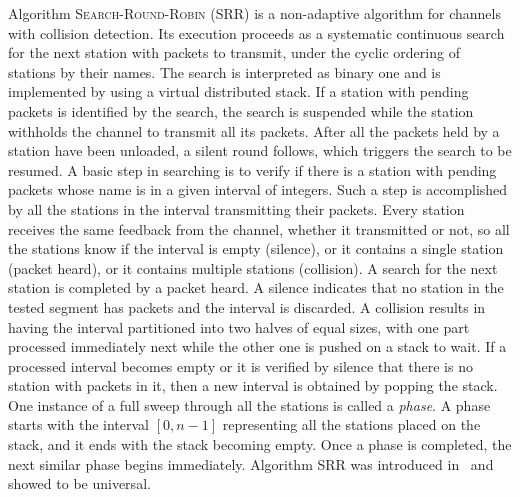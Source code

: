 \documentclass[11pt]{article}
\begin{document}
Algorithm \textsc{Search-Round-Robin} (\textsc{SRR}) is a non-adaptive algorithm for channels with collision detection.
Its execution proceeds as a systematic continuous search for the next station with packets to transmit, under the cyclic ordering of stations by their names.  
The search is interpreted as binary one and is implemented by using a virtual distributed stack.
If a station with pending packets is identified by the search, the search is suspended while the station withholds the channel to transmit all its packets.
After all the packets held by a station have been unloaded, a silent round follows, which triggers the search to be resumed.
A basic step in searching is to verify if there is a station with pending packets whose name is in a given interval of integers.
Such a step is accomplished by all the stations in the interval transmitting their packets. 
Every station receives the same feedback from the channel, whether it transmitted or not, so all the stations know if the interval is empty (silence), or it contains a single station (packet heard), or it contains multiple stations (collision).
A search for the next station is completed by a packet heard.
A silence indicates that no station in the tested segment has packets and the interval is discarded. 
A collision results in having the interval partitioned into two halves of equal sizes, with one part processed immediately next while the other one is pushed on a stack to wait.
If a processed interval becomes empty or it is verified by silence that there is no station with packets in it, then a new interval is obtained by popping the stack.
One instance of a full sweep through all the stations is called a \emph{phase}.
A phase starts with the interval $[0,n-1]$ representing all the stations placed on the stack, and it ends with the stack becoming empty.
Once a phase is completed, the next similar phase begins immediately.
Algorithm \textsc{SRR} was  introduced in~\cite{ChlebusKR-TALG12} and showed to be universal.
\end{document}
